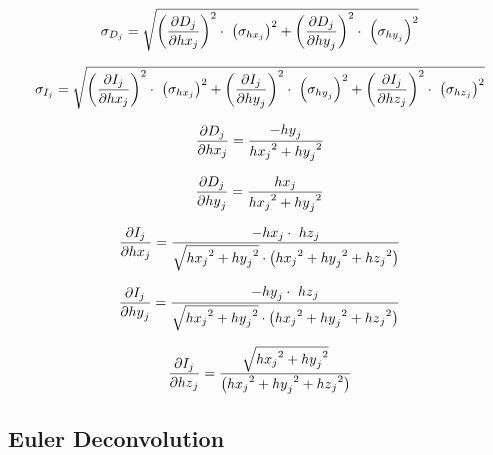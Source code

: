 \begin{equation} \label{eq:sphere21}
\centering
\sigma_{D_j}=\sqrt{\left(\frac{\partial D_j}{\partial{hx}_j}\right)^2\cdot\ \left(\sigma_{{hx}_j}\right)^2+\left(\frac{\partial D_j}{\partial{hy}_j}\right)^2\cdot\ \left(\sigma_{{hy}_j}\right)^2}
\end{equation}

\begin{equation} \label{eq:sphere22}
\centering
\sigma_{I_j}=\sqrt{\left(\frac{\partial I_j}{\partial{hx}_j}\right)^2\cdot\ \left(\sigma_{{hx}_j}\right)^2+\left(\frac{\partial I_j}{\partial{hy}_j}\right)^2\cdot\ \left(\sigma_{{hy}_j}\right)^2+\left(\frac{\partial I_j}{\partial{hz}_j}\right)^2\cdot\ \left(\sigma_{{hz}_j}\right)^2}
\end{equation}


\begin{equation} \label{eq:sphere23}
\centering
\frac{\partial D_j}{\partial{hx}_j}=\frac{-{hy}_j}{{{hx}_j}^2+{{hy}_j}^2}
\end{equation}

\begin{equation} \label{eq:sphere24}
\centering
\frac{\partial D_j}{\partial{hy}_j}=\frac{{hx}_j}{{{hx}_j}^2+{{hy}_j}^2}
\end{equation}

\begin{equation} \label{eq:sphere25}
\centering
\frac{\partial I_j}{\partial{hx}_j}=\frac{-{hx}_j\cdot \ {hz}_j}{\sqrt{{{hx}_j}^2+{{hy}_j}^2}\cdot \left({{hx}_j}^2+{{hy}_j}^2+{{hz}_j}^2\right)}
\end{equation}

\begin{equation} \label{eq:sphere26}
\centering
\frac{\partial I_j}{\partial{hy}_j}=\frac{-{hy}_j\cdot \ {hz}_j}{\sqrt{{{hx}_j}^2+{{hy}_j}^2}\cdot \left({{hx}_j}^2+{{hy}_j}^2+{{hz}_j}^2\right)}
\end{equation}

\begin{equation} \label{eq:sphere27}
\centering
\frac{\partial I_j}{\partial{hz}_j}=\frac{\sqrt{{{hx}_j}^2+{{hy}_j}^2}}{\left({{hx}_j}^2+{{hy}_j}^2+{{hz}_j}^2\right)}
\end{equation}




\subsection{Euler Deconvolution}

